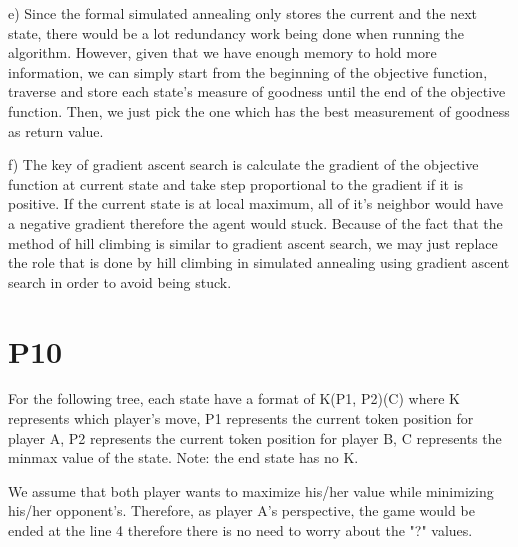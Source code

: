 \documentclass{article}
\begin{document}
e) Since the formal simulated annealing only stores the current and the next state, there would be a lot redundancy work being done when running the algorithm. However, given that we have enough memory to hold more information, we can simply start from the beginning of the objective function, traverse and store each state's measure of goodness until the end of the objective function. Then, we just pick the one which has the best measurement of goodness as return value.

f) The key of gradient ascent search is calculate the gradient of the objective function at current state and take step proportional to the gradient if it is positive. If the current state is at local maximum, all of it's neighbor would have a negative gradient therefore the agent would stuck. Because of the fact that the method of hill climbing is similar to gradient ascent search, we may just replace the role that is done by hill climbing in simulated annealing using gradient ascent search in order to avoid being stuck.

\section*{P10}

For the following tree, each state have a format of K(P1, P2)(C) where K represents which player's move, P1 represents the current token position for player A, P2 represents the current token position for player B, C represents the minmax value of the state. Note: the end state has no K.


\vspace{5mm}
\hspace{5mm}
We assume that both player wants to maximize his/her value while minimizing his/her opponent's. Therefore, as player A's perspective, the game would be ended at the line 4 therefore there is no need to worry about the "?" values.
\end{document}
